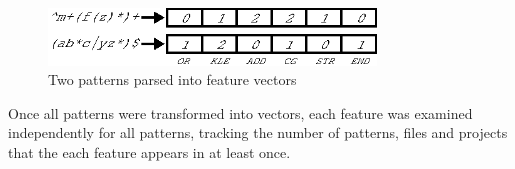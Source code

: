 \begin{figure}[hb]
\centering
\includegraphics[height=0.6in]{nontex/illustrations/featureParsing.eps}
\caption{Two patterns parsed into feature vectors}
\label{fig:featureParsing}
\vspace{-12pt}
\end{figure}

Once all patterns were transformed into vectors, each feature was examined independently for all patterns, tracking the number of patterns, files and projects that the each feature appears in at least once.
